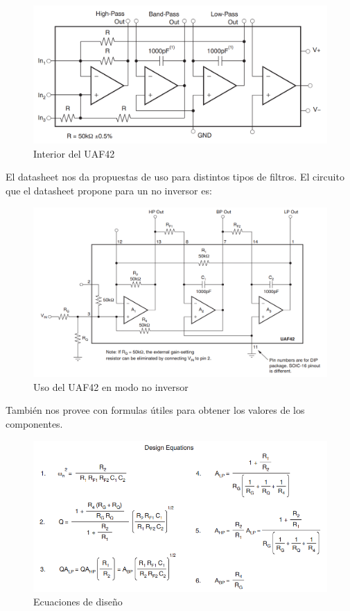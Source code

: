 \documentclass[11pt,a4paper]{report}
\begin{document}
\begin{figure}[h]
\centering
\includegraphics[scale=0.35]{figs/uaf42_internals.png}
\caption{Interior del UAF42}
\end{figure}

El datasheet nos da propuestas de uso para distintos tipos de filtros. El circuito que el datasheet propone para un no inversor es:

\begin{figure}[h]
\centering
\includegraphics[scale=0.5]{figs/uaf42_non_inv.png}
\caption{Uso del UAF42 en modo no inversor}
\end{figure}

También nos provee con formulas útiles para obtener los valores de los componentes.

\begin{figure}[h]
\label{uaf42_eq}
\centering
\includegraphics[scale=0.6]{figs/uaf42_eq.png}
\caption{Ecuaciones de diseño}
\end{figure}
\end{document}
